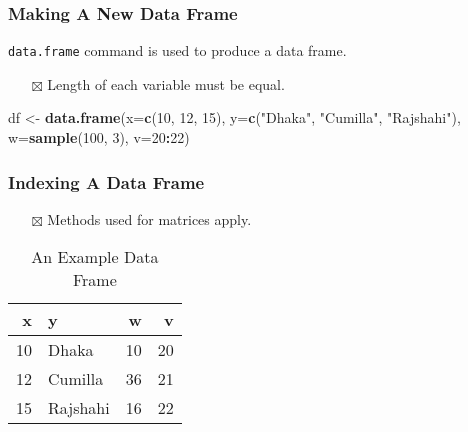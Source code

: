 \documentclass[
]{book}
\newenvironment{Shaded}{\begin{snugshade}}{\end{snugshade}}
\newcommand{\DataTypeTok}[1]{\textcolor[rgb]{0.13,0.29,0.53}{#1}}
\newcommand{\DecValTok}[1]{\textcolor[rgb]{0.00,0.00,0.81}{#1}}
\newcommand{\KeywordTok}[1]{\textcolor[rgb]{0.13,0.29,0.53}{\textbf{#1}}}
\newcommand{\NormalTok}[1]{#1}
\newcommand{\OperatorTok}[1]{\textcolor[rgb]{0.81,0.36,0.00}{\textbf{#1}}}
\newcommand{\StringTok}[1]{\textcolor[rgb]{0.31,0.60,0.02}{#1}}
\providecommand{\tightlist}{%
  \setlength{\itemsep}{0pt}\setlength{\parskip}{0pt}}
\begin{document}
\hypertarget{making-a-new-data-frame}{%
\subsubsection{Making A New Data Frame}\label{making-a-new-data-frame}}

\texttt{data.frame} command is used to produce a data frame.

\begin{itemize}
\tightlist
\item[$\boxtimes$]
  Length of each variable must be equal.
\end{itemize}

\begin{Shaded}
\begin{Highlighting}[]
\NormalTok{df <-}\StringTok{ }\KeywordTok{data.frame}\NormalTok{(}\DataTypeTok{x=}\KeywordTok{c}\NormalTok{(}\DecValTok{10}\NormalTok{, }\DecValTok{12}\NormalTok{, }\DecValTok{15}\NormalTok{),}
                 \DataTypeTok{y=}\KeywordTok{c}\NormalTok{(}\StringTok{"Dhaka"}\NormalTok{, }\StringTok{"Cumilla"}\NormalTok{, }\StringTok{"Rajshahi"}\NormalTok{),}
                 \DataTypeTok{w=}\KeywordTok{sample}\NormalTok{(}\DecValTok{100}\NormalTok{, }\DecValTok{3}\NormalTok{),}
                 \DataTypeTok{v=}\DecValTok{20}\OperatorTok{:}\DecValTok{22}\NormalTok{)}
\end{Highlighting}
\end{Shaded}

\hypertarget{indexing-a-data-frame}{%
\subsubsection{Indexing A Data Frame}\label{indexing-a-data-frame}}

\begin{itemize}
\tightlist
\item[$\boxtimes$]
  Methods used for matrices apply.
\end{itemize}

\begin{table}

\caption{\label{tab:df}An Example Data Frame}
\centering
\begin{tabular}[t]{r|l|r|r}
\hline
x & y & w & v\\
\hline
10 & Dhaka & 10 & 20\\
\hline
12 & Cumilla & 36 & 21\\
\hline
15 & Rajshahi & 16 & 22\\
\hline
\end{tabular}
\end{table}
\end{document}

